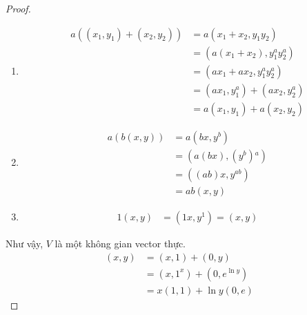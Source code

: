 \begin{proof}
\begin{enumerate}[label = (V\arabic*)]
\begin{align*}
                  (a + b)(x, y) & = ((a + b)x, y^{a + b})     \\
                                & = (ax + bx, y^{a}y^{b})     \\
                                & = (ax, y^{a}) + (bx, y^{b}) \\
                                & = a(x, y) + b(x, y)
              \end{align*}
        \item
              \begin{align*}
                  a((x_{1}, y_{1}) + (x_{2}, y_{2})) & = a(x_{1} + x_{2}, y_{1}y_{2})              \\
                                                     & = (a(x_{1} + x_{2}), y^{a}_{1}y^{a}_{2})    \\
                                                     & = (ax_{1} + ax_{2}, y^{a}_{1}y^{a}_{2})     \\
                                                     & = (ax_{1}, y^{a}_{1}) + (ax_{2}, y^{a}_{2}) \\
                                                     & = a(x_{1},y_{1}) + a(x_{2}, y_{2})
              \end{align*}
        \item
              \begin{align*}
                  a(b(x, y)) & = a(bx, y^{b})           \\
                             & = (a(bx), (y^{b}){}^{a}) \\
                             & = ((ab)x, y^{ab})        \\
                             & = ab(x, y)
              \end{align*}
        \item
              \begin{align*}
                  1(x, y) & = (1x, y^{1}) = (x, y)
              \end{align*}
    \end{enumerate}
    
    Như vậy, $V$ là một không gian vector thực.
    \begin{align*}
        (x, y) & = (x, 1) + (0, y)             \\
               & = (x, 1^{x}) + (0, e^{\ln y}) \\
               & = x(1, 1) + \ln y (0, e)
    \end{align*}
    

\end{proof}
